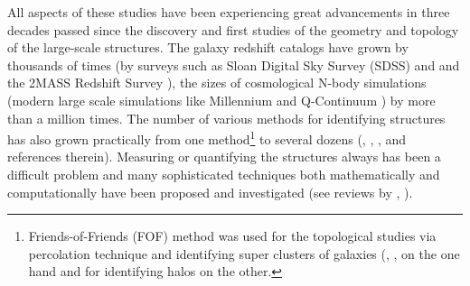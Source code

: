 All aspects of these studies have been experiencing great advancements in  three decades passed since the discovery and first studies of the geometry and topology  of the large-scale structures. The galaxy redshift catalogs have grown by thousands of times (by surveys such as Sloan Digital Sky Survey (SDSS) \citealt{Tegmark2003} and \citealt{Albareti2016} and the 2MASS Redshift Survey \citealt{Huchra2012}), the sizes of cosmological N-body simulations (modern large scale simulations like Millennium \citealt{Springel2005b} and Q-Continuum \citealt{Heitmann2015}) by more than a million times. The number of various methods for identifying  structures has also grown practically from  one method\footnote{Friends-of-Friends (FOF) method was used for the topological studies via percolation technique and identifying super clusters of galaxies (\citealt{Zeldovich1982}, \citealt{Shandarin1983}, \citealt{Shandarin1983b} on the one hand and for identifying halos \citealt{Davis1985} on the other.}  to several dozens (\citealt{Colberg2008}, \citealt{Knebe2011a}, \citealt{Onions2012}, \citealt{Knebe2013} and references therein). Measuring or quantifying  the structures always has  been a difficult problem and many sophisticated  techniques both mathematically and computationally have been proposed and investigated (see reviews by \citealt{Weygaert2008c}, \citealt{Weygaert2008}).


